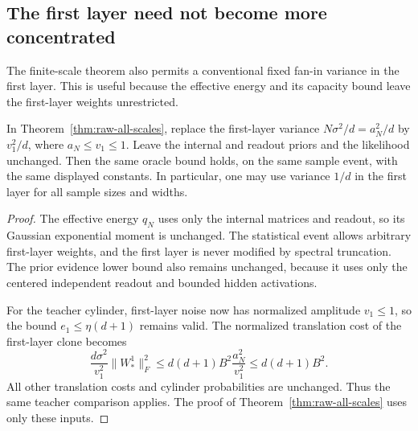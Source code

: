 \subsection{The first layer need not become more concentrated}
\label{sec:first-layer-scale-extension}

The finite-scale theorem also permits a conventional fixed fan-in
variance in the first layer.  This is useful because the effective
energy and its capacity bound leave the first-layer weights unrestricted.

\begin{corollary}
\label{cor:first-layer-scale-extension}
In Theorem~\ref{thm:raw-all-scales}, replace the first-layer variance
$N\sigma^2/d=a_N^2/d$ by $v_1^2/d$, where $a_N\leq v_1\leq1$.
Leave the internal and readout priors and the likelihood unchanged.
Then the same oracle bound holds, on the same sample event, with the
same displayed constants.  In particular, one may use variance $1/d$
in the first layer for all sample sizes and widths.
\end{corollary}
\begin{proof}
The effective energy $q_N$ uses only the internal matrices and readout,
so its Gaussian exponential moment is unchanged.  The statistical event
allows arbitrary first-layer weights, and the first layer is never
modified by spectral truncation.  The prior evidence lower bound
also remains unchanged, because it uses only the centered independent
readout and bounded hidden activations.

For the teacher cylinder, first-layer noise now has normalized amplitude
$v_1\leq1$, so the bound $e_1\leq\eta(d+1)$ remains valid.
The normalized translation cost of the first-layer clone becomes
\[
 \frac{d\sigma^2}{v_1^2}\|W_*^1\|_F^2
 \leq d(d+1)B^2\frac{a_N^2}{v_1^2}
 \leq d(d+1)B^2.
\]
All other translation costs and cylinder probabilities are unchanged.
Thus the same teacher comparison applies.  The proof of
Theorem~\ref{thm:raw-all-scales} uses only these inputs.
\end{proof}
